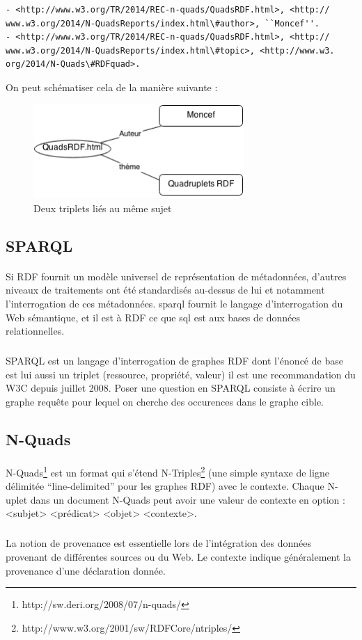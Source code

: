 \documentclass[12pt,a4]{report}
\begin{document}
\begin{verbatim}
- <http://www.w3.org/TR/2014/REC-n-quads/QuadsRDF.html>, <http://
www.w3.org/2014/N-QuadsReports/index.html\#author>, ``Moncef''.
- <http://www.w3.org/TR/2014/REC-n-quads/QuadsRDF.html>, <http://
www.w3.org/2014/N-QuadsReports/index.html\#topic>, <http://www.w3.
org/2014/N-Quads\#RDFquad>.
\end{verbatim}
On peut schématiser cela de la manière suivante :
\begin{figure}[H]
\centering
\centering
\includegraphics[width=8cm]{Diag.png}
\caption{Deux triplets liés au même sujet}
\end{figure}
\newpage
\subsection{SPARQL}
\paragraph{}
Si RDF fournit un modèle universel de représentation de métadonnées, d'autres niveaux de traitements ont été standardisés au-dessus de lui et notamment l'interrogation de ces métadonnées. 
\gls{sparql} fournit le langage d'interrogation du Web sémantique, et il est à RDF ce que \gls{sql} est aux bases de données relationnelles.
\subparagraph{}
SPARQL est un langage d'interrogation de graphes RDF dont l'énoncé de base est lui aussi un triplet (ressource, propriété, valeur) il est une recommandation du W3C depuis juillet 2008.
Poser une question en SPARQL consiste à écrire un graphe requête pour lequel on cherche des occurences dans le graphe cible.
\subsection{N-Quads}
\paragraph{}
N-Quads\footnote{http://sw.deri.org/2008/07/n-quads/} est un format qui s'étend N-Triples\footnote{http://www.w3.org/2001/sw/RDFCore/ntriples/} (une simple syntaxe de ligne délimitée ``line-delimited'' pour les graphes RDF) avec le contexte. Chaque N-uplet dans un document N-Quads peut avoir une valeur de contexte en option :
<subjet> <prédicat> <objet> <contexte>.
\subparagraph{}
La notion de provenance est essentielle lors de l'intégration des données provenant de différentes sources ou du Web. Le contexte indique généralement la provenance d'une déclaration donnée.
\end{document}
